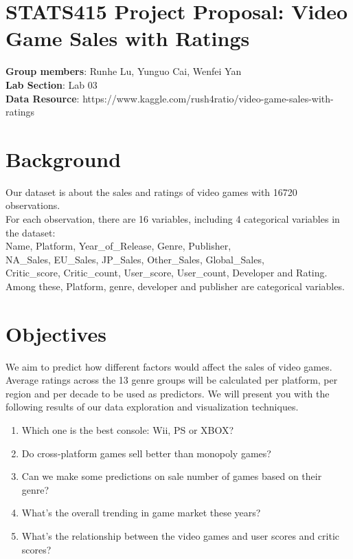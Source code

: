 \documentclass[10pt,a4paper]{article}
\begin{document}
\section*{STATS415 Project Proposal: Video Game Sales with Ratings}
	\begin{center}
		\textbf{Group members}: Runhe Lu, Yunguo Cai, Wenfei Yan\\
		\textbf{Lab Section}: Lab 03\\
		 \textbf{Data Resource}: https://www.kaggle.com/rush4ratio/video-game-sales-with-ratings\\
	\end{center}

	\section*{Background}
	Our dataset is about the sales and ratings of video games with 16720 observations.\\
	For each observation, there are 16 variables, including 4 categorical variables in the dataset: \\
	\indent Name, Platform, Year\_of\_Release, Genre, Publisher, \\
	\indent NA\_Sales, EU\_Sales, JP\_Sales, Other\_Sales, Global\_Sales,\\
	\indent Critic\_score, Critic\_count, User\_score, User\_count, Developer and Rating.\\
	Among these, Platform, genre, developer and publisher are categorical variables.
	
	\section*{Objectives}
	We aim to predict how different factors would affect the sales of video games. Average ratings across the 13 genre groups will be calculated per platform, per region and per decade to be used as predictors. We will present you with the following results of our data exploration and visualization techniques.
		\begin{enumerate}
		\item Which one is the best console: Wii, PS or XBOX?
		\item Do cross-platform games sell better than monopoly games?
		\item Can we make some predictions on sale number of games based on their genre?
		\item What's the overall trending in game market these years? 
		\item What's the relationship between the video games and user scores and critic scores?
		\end{enumerate}
\end{document}
